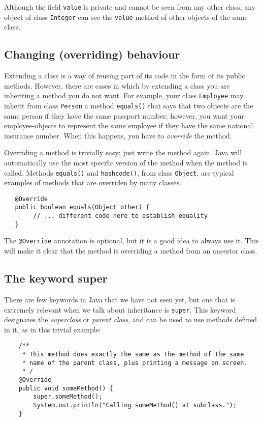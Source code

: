 Although the field \verb+value+ is private and cannot be seen from any
other class, any object of class \verb+Integer+ can see the
\verb+value+ method of other objects of the same class. 

\subsection{Changing (overriding) behaviour}
\label{sec:chang-overr-behav}

Extending a class is a way of reusing part of its code in the form of
its public methods. However, there are cases in which by extending a
class you are inheriting a method you do not want. For example, your
class \verb+Employee+ may inherit from class \verb+Person+ a method
\verb+equals()+ that says that two objects are the same person if they
have the same passport number; however, you want your employee-objects
to represent the same employee if they have the same national
insurance number. When this happens, you have to \emph{override} the
method. 

Overriding a method is trivially easy: just write the method
again. Java will automatically use the most specific version of the
method when the method is called. Methods \verb+equals()+ and
\verb+hashcode()+, from class \verb+Object+, are typical examples of
methods that are overriden by many classes. 

\begin{verbatim}
   @Override
   public boolean equals(Object other) {
        // ... different code here to establish equality
   }
\end{verbatim}

The \verb+@Override+ annotation is optional, but it is a good idea to
always use it. This will make it clear that the method is overriding a
method from an ancestor class. 

\subsection{The keyword super}
\label{sec:keyword-super}

There are few keywords in Java that we have not seen yet, but one that
is extremely relevant when we talk about inheritance is
\verb+super+. This keyword designates the \emph{superclass} or
\emph{parent class}, and can be used to use methods defined in it, as
in this trivial example: 

\begin{verbatim}
    /**
     * This method does exactly the same as the method of the same
     * name of the parent class, plus printing a message on screen. 
     * /
    @Override
    public void someMethod() {
        super.someMethod();
        System.out.println("Calling someMethod() at subclass.");
    }
\end{verbatim}

